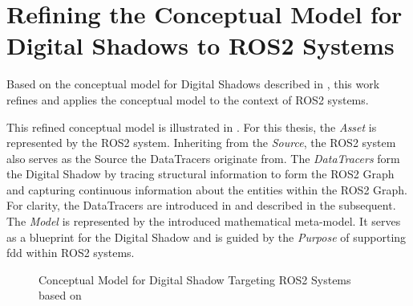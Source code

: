     \section{Refining the Conceptual Model for Digital Shadows to ROS2 Systems} \label{sec:dshadow:conceptualmodel}
    Based on the conceptual model for Digital Shadows described in , this work refines and applies the conceptual model to the context of ROS2 systems.

    This refined conceptual model is illustrated in .
    For this thesis, the \emph{Asset} is represented by the ROS2 system. Inheriting from the \emph{Source}, the ROS2 system also serves as the Source the DataTracers originate from. The \emph{DataTracers} form the Digital Shadow by tracing structural information to form the ROS2 Graph and capturing continuous information about the entities within the ROS2 Graph. For clarity, the DataTracers are introduced in  and described in the subsequent. The \emph{Model} is represented by the introduced mathematical meta-model. It serves as a blueprint for the Digital Shadow and is guided by the \emph{Purpose} of supporting \acl{fdd} within ROS2 systems.
    \begin{figure}[h]
        \centering
        
        \caption[Conceptual Model for Digital Shadow Targeting ROS2 Systems]{Conceptual Model for Digital Shadow Targeting ROS2 Systems based on \Textcite{DSConceptualModelSpringer}} \label{fig:tikz:dshadow:conceptualmodel}
    \end{figure}

